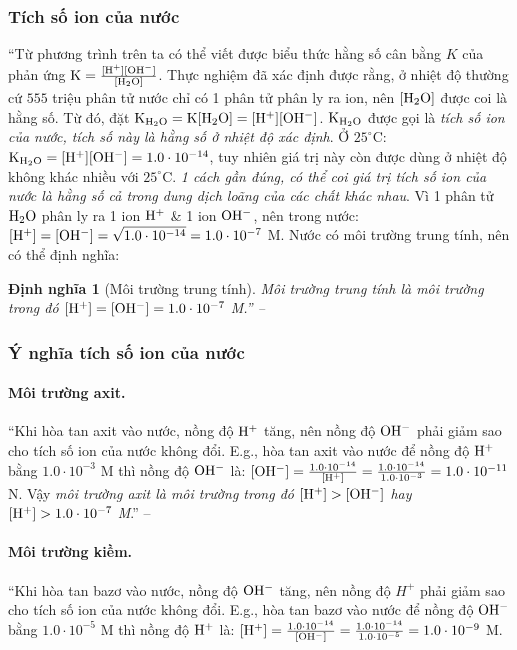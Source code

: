 \documentclass[oneside]{book}
\numberwithin{equation}{section}
\newtheorem{dinhnghia}{Định nghĩa}[section]
\begin{document}
\subsubsection{Tích số ion của nước}
``Từ phương trình trên ta có thể viết được biểu thức hằng số cân bằng $K$ của phản ứng $\rm K = \frac{[H^+][OH^-]}{[H_2O]}$. Thực nghiệm đã xác định được rằng, ở nhiệt độ thường cứ $555$ triệu phân tử nước chỉ có 1 phân tử phân ly ra ion, nên $\rm[H_2O]$ được coi là hằng số. Từ đó, đặt $\rm K_{H_2O} = K[H_2O] = [H^+][OH^-]$. $\rm K_{H_2O}$ được gọi là \textit{tích số ion của nước, tích số này là hằng số ở nhiệt độ xác định}. Ở $25^\circ$C: $\rm K_{H_2O} = [H^+][OH^-] = 1.0\cdot 10^{-14}$, tuy nhiên giá trị này còn được dùng ở nhiệt độ không khác nhiều với $25^\circ$C. \textit{1 cách gần đúng, có thể coi giá trị tích số ion của nước là hằng số cả trong dung dịch loãng của các chất khác nhau}. Vì 1 phân tử $\rm H_2O$ phân ly ra 1 ion $\rm H^+$ \& 1 ion $\rm OH^-$, nên trong nước: $\rm[H^+] = [OH^-] = \sqrt{1.0\cdot 10^{-14}} = 1.0\cdot 10^{-7}$ M. Nước có môi trường trung tính, nên có thể định nghĩa:

\begin{dinhnghia}[Môi trường trung tính]
	\emph{Môi trường trung tính} là môi trường trong đó $\rm[H^+] = [OH^-] = 1.0\cdot 10^{-7}$ M.'' -- \cite[p. 17]{SGK_Hoa_Hoc_11_nang_cao}
\end{dinhnghia}

\subsubsection{Ý nghĩa tích số ion của nước}

\paragraph{Môi trường axit.} ``Khi hòa tan axit vào nước, nồng độ $\rm H^+$ tăng, nên nồng độ $\rm OH^-$ phải giảm sao cho tích số ion của nước không đổi. E.g., hòa tan axit vào nước để nồng độ $\rm H^+$ bằng $1.0\cdot 10^{-3}$ M thì nồng độ $\rm OH^-$ là: $\rm[OH^-] = \frac{1.0\cdot 10^{-14}}{[H^+]} = \frac{1.0\cdot 10^{-14}}{1.0\cdot 10^{-3}} = 1.0\cdot 10^{-11}$ N. Vậy \textit{môi trường axit là môi trường trong đó $\rm[H^+] > [OH^-]$ hay $\rm[H^+] > 1.0\cdot 10^{-7}$ M}.'' -- \cite[p. 18]{SGK_Hoa_Hoc_11_nang_cao}

\paragraph{Môi trường kiềm.} ``Khi hòa tan bazơ vào nước, nồng độ $\rm OH^-$ tăng, nên nồng độ $H^+$ phải giảm sao cho tích số ion của nước không đổi. E.g., hòa tan bazơ vào nước để nồng độ $\rm OH^-$ bằng $1.0\cdot 10^{-5}$ M thì nồng độ $\rm H^+$ là: $\rm[H^+] = \frac{1.0\cdot 10^{-14}}{[OH^-]} = \frac{1.0\cdot 10^{-14}}{1.0\cdot 10^{-5}} = 1.0\cdot 10^{-9}$ M.
\end{document}
